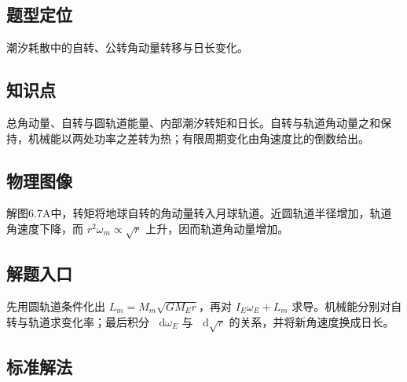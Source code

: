 \documentclass[UTF8,fontset=fandol,a4paper,11pt]{ctexart}
\newcommand{\dd}{\mathop{}\!\mathrm{d}}
\begin{document}


\subsection*{题型定位}

潮汐耗散中的自转、公转角动量转移与日长变化。



\subsection*{知识点}

总角动量、自转与圆轨道能量、内部潮汐转矩和日长。自转与轨道角动量之和保持，机械能以两处功率之差转为热；有限周期变化由角速度比的倒数给出。




\subsection*{物理图像}

解图6.7A中，转矩将地球自转的角动量转入月球轨道。近圆轨道半径增加，轨道角速度下降，而 $r^2\omega_m\propto\sqrt r$ 上升，因而轨道角动量增加。



\subsection*{解题入口}

先用圆轨道条件化出 $L_m=M_m\sqrt{GM_Er}$，再对 $I_E\omega_E+L_m$ 求导。机械能分别对自转与轨道求变化率；最后积分 $\dd\omega_E$ 与 $\dd\sqrt r$ 的关系，并将新角速度换成日长。



\subsection*{标准解法}
\end{document}
